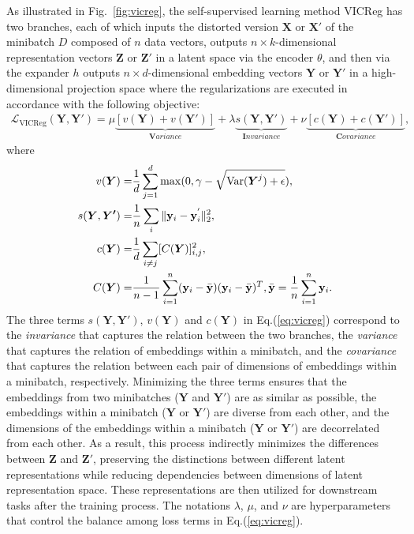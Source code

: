 \documentclass{article}
\begin{document}
As illustrated in Fig.~\ref{fig:vicreg}, the self-supervised learning method VICReg has two branches, each of which inputs the distorted version $\boldsymbol{X}$ or $\boldsymbol{X'}$ of the minibatch $D$ composed of $n$ data vectors, outputs $n \times k$-dimensional representation vectors $\boldsymbol{Z}$ or $\boldsymbol{Z'}$ in a latent space via the encoder $\theta$, and then via the expander $h$ outputs $n \times d$-dimensional embedding vectors $\boldsymbol{Y}$ or $\boldsymbol{Y'}$ in a high-dimensional projection space where the regularizations are executed in accordance with the following objective:
\begin{eqnarray} \label{eq:vicreg}
    \mathcal{L}_{\text{VICReg}}(\boldsymbol{Y},\boldsymbol{Y'}) = \mu \underbrace{[v(\boldsymbol{Y})+v(\boldsymbol{Y'})]}_{\boldsymbol{V}ariance} + \lambda \underbrace{s(\boldsymbol{Y},\boldsymbol{Y'})}_{\boldsymbol{I}nvariance} +\nu \underbrace{[c(\boldsymbol{Y})+c(\boldsymbol{Y'})]}_{\boldsymbol{C}ovariance}, 
\end{eqnarray}
where
\begin{eqnarray*}
    v(\boldsymbol{Y}) =& \displaystyle\frac{1}{d}\displaystyle\sum_{j=1}^{d}\max(0,\gamma-\sqrt{\text{Var}(\boldsymbol{Y}^j)+\epsilon}), \notag \\
    s(\boldsymbol{Y},\boldsymbol{Y'})  =& \displaystyle\frac{1}{n}\displaystyle\sum_{i}\|\mathbf{y}_i-\mathbf{y}_i^{'}\|_2^2, \notag \\
    c(\boldsymbol{Y}) =& \displaystyle\frac{1}{d} \displaystyle\sum_{i \neq j}[C(\boldsymbol{Y})]_{i,j}^2, \notag \\
    C(\boldsymbol{Y}) =& \displaystyle\frac{1}{n-1}\displaystyle\sum_{i=1}^{n}(\mathbf{y}_i-\bar{\mathbf{y}})(\mathbf{y}_i-\bar{\mathbf{y}})^T, \bar{\mathbf{y}}=\displaystyle\frac{1}{n}\displaystyle\sum_{i=1}^{n}\mathbf{y}_i.
\end{eqnarray*}
The three terms $s(\boldsymbol{Y},\boldsymbol{Y'})$, $v(\boldsymbol{Y})$ and $c(\boldsymbol{Y})$ in Eq.(\ref{eq:vicreg}) correspond to the \textit{invariance} that captures the relation between the two branches, the \textit{variance} that captures the relation of embeddings within a minibatch, and the \textit{covariance} that captures the relation between each pair of dimensions of embeddings within a minibatch, respectively. 
Minimizing the three terms ensures that the embeddings from two minibatches ($\boldsymbol{Y}$ and $\boldsymbol{Y'}$) are as similar as possible, the embeddings within a minibatch ($\boldsymbol{Y}$ or $\boldsymbol{Y'}$) are diverse from each other, and the dimensions of the embeddings within a minibatch ($\boldsymbol{Y}$ or $\boldsymbol{Y'}$) are decorrelated from each other.
As a result, this process indirectly minimizes the differences between $\boldsymbol{Z}$ and $\boldsymbol{Z'}$, preserving the  distinctions between different latent representations while reducing dependencies between dimensions of latent representation space.
These representations are then utilized for downstream tasks after the training process.
The notations $\lambda$, $\mu$, and $\nu$ are hyperparameters that control the balance among loss terms in Eq.(\ref{eq:vicreg}).
\end{document}

